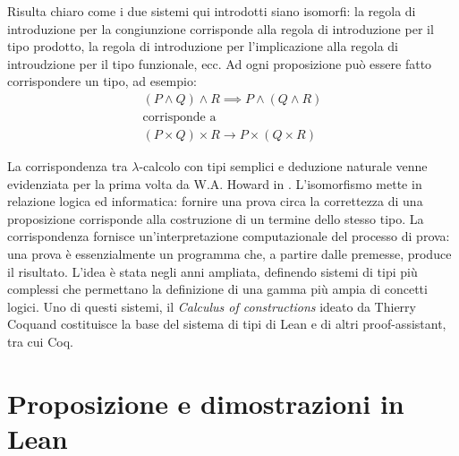 Risulta chiaro come i due sistemi qui introdotti siano isomorfi: la regola di introduzione per la congiunzione corrisponde alla regola di introduzione per il tipo prodotto, la regola di introduzione per l'implicazione alla regola di introudzione per il tipo funzionale, ecc.
Ad ogni proposizione può essere fatto corrispondere un tipo, ad esempio:
\begin{gather*}
    (P \wedge Q) \wedge R \implies P \wedge (Q \wedge R) \\
    \text{corrisponde a} \\
    (P \times Q) \times R \rightarrow P \times (Q \times R)
\end{gather*}

La corrispondenza tra $\lambda$-calcolo con tipi semplici e deduzione naturale venne evidenziata per la prima volta da W.A. Howard in \cite{Howard1980-HOWTFN-2}.
L'isomorfismo mette in relazione logica ed informatica: fornire una prova circa la correttezza di una proposizione corrisponde alla costruzione di un termine dello stesso tipo. La corrispondenza fornisce un'interpretazione computazionale del processo di prova: una prova è essenzialmente un programma che, a partire dalle premesse, produce il risultato. L'idea è stata negli anni ampliata, definendo sistemi di tipi più complessi che permettano la definizione di una gamma più ampia di concetti logici. Uno di questi sistemi, il \emph{Calculus of constructions} ideato da Thierry Coquand \cite{coquand:inria-00076024} costituisce la base del sistema di tipi di Lean e di altri proof-assistant, tra cui Coq.

\section{Proposizione e dimostrazioni in Lean}
